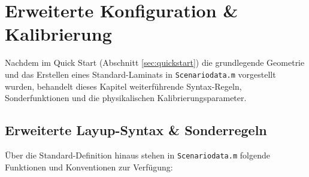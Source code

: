 \chapter{Erweiterte Konfiguration \& Kalibrierung} \label{ch:konfiguration}

Nachdem im Quick Start (Abschnitt \ref{sec:quickstart}) die grundlegende Geometrie und das Erstellen eines Standard-Laminats in \texttt{Scenariodata.m} vorgestellt wurden, behandelt dieses Kapitel weiterführende Syntax-Regeln, Sonderfunktionen und die physikalischen Kalibrierungsparameter.

\section{Erweiterte Layup-Syntax \& Sonderregeln} \label{sec:layup_syntax}

Über die Standard-Definition hinaus stehen in \texttt{Scenariodata.m} folgende Funktionen und Konventionen zur Verfügung:

